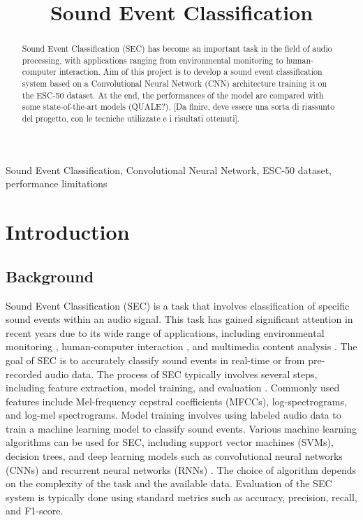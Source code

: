 \documentclass{article}
\title{Sound Event Classification}
\begin{document}
\ninept
\maketitle

\begin{sloppy}

\begin{abstract}
  Sound Event Classification (SEC) has become an important task in the field of
  audio processing, with applications ranging from environmental monitoring to
  human-computer interaction. Aim of this project is to develop a sound event classification system
  based on a Convolutional Neural Network (CNN) architecture training it on the ESC-50 dataset.
  At the end, the performances of the model are compared with some state-of-the-art models (QUALE?).
  [Da finire, deve essere una sorta di riassunto del progetto, con le tecniche utilizzate e i risultati ottenuti].
\end{abstract}

\begin{keywords}
Sound Event Classification, Convolutional Neural Network, ESC-50 dataset, performance limitations
\end{keywords}

\section{Introduction}
\label{sec:intro}

\subsection{Background}
\label{sec:background}
Sound Event Classification (SEC) is a task that involves classification of
specific sound events within an audio signal. This task has gained significant attention in recent years
due to its wide range of applications, including environmental monitoring \cite{birdsCNN2017}, human-computer interaction \cite{emotionRecognition2021},
and multimedia content analysis \cite{kumar2016weaklysupervisedscalableaudio}.
The goal of SEC is to accurately classify sound events in real-time or from pre-recorded audio data.
The process of SEC typically involves several steps, including feature extraction, model training, and evaluation \cite{ReviewSoundEvent2025}.
Commonly used features include Mel-frequency cepstral coefficients (MFCCs), log-spectrograms, and log-mel spectrograms.
Model training involves using labeled audio data to train a machine learning model to classify sound events.
Various machine learning algorithms can be used for SEC, including support vector machines (SVMs), decision trees, and deep
learning models such as convolutional neural networks (CNNs) and recurrent neural networks (RNNs) \cite{DescriptiveESC2022}.
The choice of algorithm depends on the complexity of the task and the available data.
Evaluation of the SEC system is typically done using standard metrics such as accuracy, precision, recall, and F1-score.


\end{sloppy}
\end{document}
